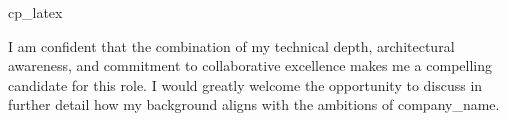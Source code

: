 \documentclass[11pt,a4paper,sans]{moderncv}
\newcommand{\companyname}{company_name}
\newcommand{\bodyvariant}{cp_latex}
\begin{document}
\bodyvariant


I am confident that the combination of my technical depth, architectural awareness, and commitment to collaborative excellence makes me a compelling candidate for this role. I would greatly welcome the opportunity to discuss in further detail how my background aligns with the ambitions of \companyname.
\makeletterclosing
\end{document}
